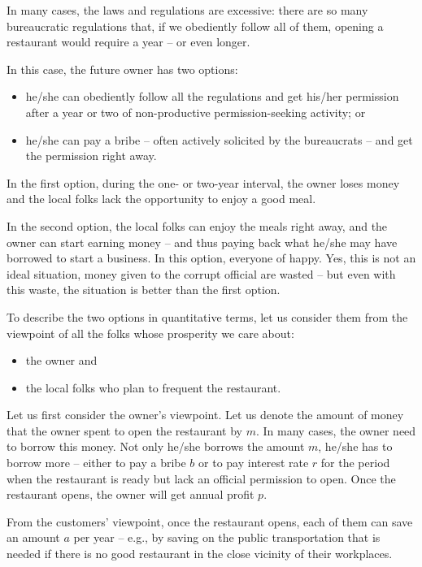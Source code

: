 \documentclass{article}
\begin{document}
 In many cases, the laws and regulations are excessive: there are so many bureaucratic regulations that, if we obediently follow all of them, opening a restaurant would require a year -- or even longer.
\medskip

 In this case, the future owner has two options:
\begin{itemize}
\item he/she can obediently follow all the regulations and get his/her permission after a year or two of non-productive permission-seeking activity; or
\item he/she can pay a bribe -- often actively solicited by the bureaucrats -- and get the permission right away.
\end{itemize}
In the first option, during the one- or two-year interval, the owner loses money and the local folks lack the opportunity to enjoy a good meal.

In the second option, the local folks can enjoy the meals right away, and the owner can start earning money -- and thus paying back what he/she may have borrowed to start a business.
In this option, everyone of happy. Yes, this is not an ideal situation, money given to the corrupt official are wasted -- but even with this waste, the situation is better than the first option.
\medskip

 To describe the two options in quantitative terms, let us
consider them from the viewpoint of all the folks whose prosperity we care about:
\begin{itemize}
\item the owner and
\item the local folks who plan to frequent the restaurant.
\end{itemize}

Let us first consider the owner's viewpoint. Let us denote the amount of money that the owner spent to open the restaurant by $m$. In many cases, the owner need to borrow this money. Not only he/she borrows the amount $m$, he/she has to borrow more -- either to pay a bribe $b$ or to pay interest rate $r$ for the period when the restaurant is ready but lack an official permission to open. Once the restaurant opens, the owner will get annual profit $p$.

From the customers' viewpoint, once the restaurant opens, each of them can save an amount $a$ per year -- e.g., by saving on the public transportation that is needed if there is no good restaurant in the close vicinity of their workplaces.
\medskip
\end{document}
